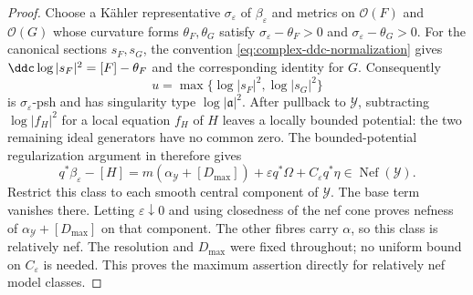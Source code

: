 \begin{proof}
Choose a K\"ahler representative $\sigma_\varepsilon$ of
$\beta_\varepsilon$ and metrics on $\mathcal O(F)$ and
$\mathcal O(G)$ whose curvature forms $\theta_F,\theta_G$ satisfy
$\sigma_\varepsilon-\theta_F>0$ and
$\sigma_\varepsilon-\theta_G>0$.  For the canonical sections $s_F,s_G$,
the convention \eqref{eq:complex-ddc-normalization} gives
$\ddc\log|s_F|^2=[F]-\theta_F$ and the corresponding identity for $G$.
Consequently
\[
 u=\max\{\log|s_F|^2,\log|s_G|^2\}
\]
is $\sigma_\varepsilon$-psh and has singularity type
$\log|\mathfrak a|^2$.  After pullback to $\mathcal Y$, subtracting
$\log|f_H|^2$ for a local equation $f_H$ of $H$ leaves a locally
bounded potential: the two remaining ideal generators have no common zero.
The bounded-potential regularization argument in
\cite[Proposition~5.0.1, p.~44]{MPTropicalV2} therefore gives
\[
 q^*\beta_\varepsilon-[H]
 =m(\alpha_{\mathcal Y}+[D_{\max}])
      +\varepsilon q^*\Omega+C_\varepsilon q^*\eta
 \in\operatorname{Nef}(\mathcal Y).
\]
Restrict this class to each smooth central component of $\mathcal Y$.
The base term vanishes there.  Letting $\varepsilon\downarrow0$ and
using closedness of the nef cone proves nefness of
$\alpha_{\mathcal Y}+[D_{\max}]$ on that component.  The other fibres
carry $\alpha$, so this class is relatively nef.  The resolution and
$D_{\max}$ were fixed throughout; no uniform bound on
$C_\varepsilon$ is needed.  This proves the maximum assertion directly
for relatively nef model classes.
\end{proof}

